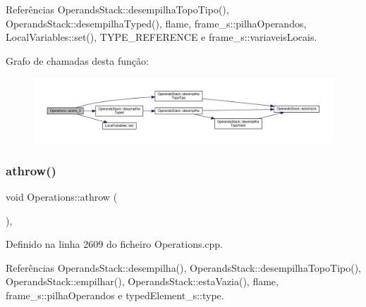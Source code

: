 Referências Operands\+Stack\+::desempilha\+Topo\+Tipo(), Operands\+Stack\+::desempilha\+Typed(), flame, frame\+\_\+s\+::pilha\+Operandos, Local\+Variables\+::set(), T\+Y\+P\+E\+\_\+\+R\+E\+F\+E\+R\+E\+N\+CE e frame\+\_\+s\+::variaveis\+Locais.

Grafo de chamadas desta função\+:
\nopagebreak
\begin{figure}[H]
\begin{center}
\leavevmode
\includegraphics[width=350pt]{classOperations_ac3c02b3ff78b6222bd58bebb4f01c083_cgraph}
\end{center}
\end{figure}
\mbox{\label{classOperations_a2a5eea0fb18391bb3854dfe55c8ac5d3}} 
\subsubsection{\texorpdfstring{athrow()}{athrow()}}
{\footnotesize\ttfamily void Operations\+::athrow (\begin{DoxyParamCaption}{ }\end{DoxyParamCaption})\hspace{0.3cm}{\ttfamily [static]}, {\ttfamily [private]}}



Definido na linha 2609 do ficheiro Operations.\+cpp.



Referências Operands\+Stack\+::desempilha(), Operands\+Stack\+::desempilha\+Topo\+Tipo(), Operands\+Stack\+::empilhar(), Operands\+Stack\+::esta\+Vazia(), flame, frame\+\_\+s\+::pilha\+Operandos e typed\+Element\+\_\+s\+::type.


